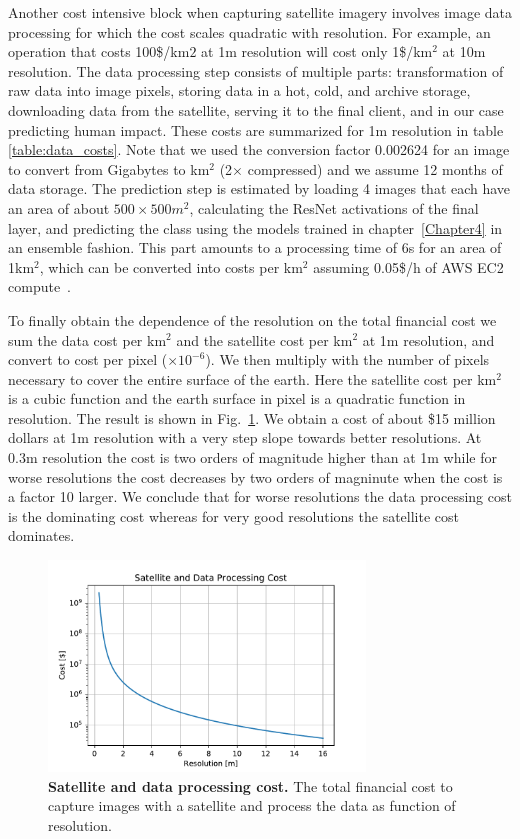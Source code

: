 Another cost intensive block when capturing satellite imagery involves image data processing for which the cost scales quadratic with resolution. For example, an operation that costs 100\$/km$2$ at 1m resolution will cost only 1\$/km$^2$ at 10m resolution. The data processing step consists of multiple parts: transformation of raw data into image pixels, storing data in a hot, cold, and archive storage, downloading data from the satellite, serving it to the final client, and in our case predicting human impact. These costs are summarized for 1m resolution in table \ref{table:data_costs}. Note that we used the conversion factor 0.002624 for an image to convert from Gigabytes to km$^2$ (2$\times$ compressed) and we assume 12 months of data storage. The prediction step is estimated by loading 4 images that each have an area of about $500\times500m^2$, calculating the ResNet activations of the final layer, and predicting the class using the models trained in chapter~\ref{Chapter4} in an ensemble fashion. This part amounts to a processing time of 6s for an area of 1km$^2$, which can be converted into costs per km$^2$ assuming 0.05\$/h of AWS EC2 compute~\parencite{aws}.

To finally obtain the dependence of the resolution on the total financial cost we sum the data cost per km$^2$ and the satellite cost per km$^2$ at 1m resolution, and convert to cost per pixel ($\times 10^{-6}$). We then multiply with the number of pixels necessary to cover the entire surface of the earth. Here the satellite cost per km$^2$ is a cubic function and the earth surface in pixel is a quadratic function in resolution. The result is shown in Fig.~\ref{fig:costs}. We obtain a cost of about \$15 million dollars at 1m resolution with a very step slope towards better resolutions. At 0.3m resolution the cost is two orders of magnitude higher than at 1m while for worse resolutions the cost decreases by two orders of magninute when the cost is a factor 10 larger. We conclude that for worse resolutions the data processing cost is the dominating cost whereas for very good resolutions the satellite cost dominates.

\begin{figure}[h!]
	\centering
	\includegraphics[width=0.75\textwidth]{Figures/costs.pdf}
	\captionsetup{width=1\linewidth}
	\caption{\textbf{Satellite and data processing cost.} The total financial cost to capture images with a satellite and process the data as function of resolution.}
	\label{fig:costs}
\end{figure}


